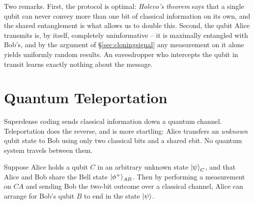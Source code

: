 \documentclass[a4paper]{scrartcl}
\begin{document}
Two remarks. First, the protocol is optimal: \emph{Holevo's theorem} says that a single qubit can never convey more than one bit of classical information on its own, and the shared entanglement is what allows us to double this. Second, the qubit Alice transmits is, by itself, completely uninformative -- it is maximally entangled with Bob's, and by the argument of \S\ref{sec:cloningsignal} any measurement on it alone yields uniformly random results. An eavesdropper who intercepts the qubit in transit learns exactly nothing about the message.

\section{Quantum Teleportation}\label{sec:teleport}

Superdense coding sends classical information down a quantum channel. Teleportation does the reverse, and is more startling: Alice transfers an \emph{unknown} qubit state to Bob using only two classical bits and a shared ebit. No quantum system travels between them.

\begin{theorem}
	Suppose Alice holds a qubit $C$ in an arbitrary unknown state $\ket{\psi}_C$, and that Alice and Bob share the Bell state $\ket{\phi^+}_{AB}$. Then by performing a measurement on $CA$ and sending Bob the two-bit outcome over a classical channel, Alice can arrange for Bob's qubit $B$ to end in the state $\ket{\psi}$.
\end{theorem}
\end{document}
